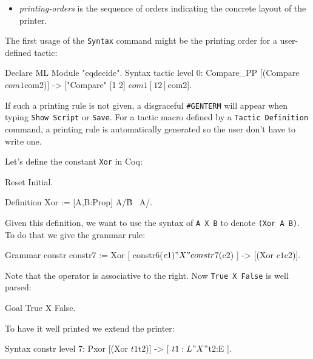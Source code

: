 {\begin{itemize}
\item {\it printing-orders} is the sequence of orders indicating the
  concrete layout of the printer.
\end{itemize}

\firstexample


The first usage of the \texttt{Syntax} command might be the printing
order for a user-defined tactic: 

\begin{coq_example*}
Declare ML Module "eqdecide".
Syntax tactic level 0:
  Compare_PP [(Compare $com1 $com2)]    -> 
            ["Compare" [1 2] $com1 [1 2] $com2].
\end{coq_example*}

If such a printing rule is not given, a disgraceful \verb+#GENTERM+
will appear when typing \texttt{Show Script} or \texttt{Save}. For
a tactic macro defined by a \texttt{Tactic Definition} command, a
printing rule is automatically generated so the user don't have to
write one.


Let's define the constant \verb+Xor+ in Coq:

\begin{coq_eval}
  Reset Initial.
\end{coq_eval}

\begin{coq_example*}
Definition Xor := [A,B:Prop] A/\~B \/ ~A/\B.
\end{coq_example*}

Given this definition, we want to use the syntax of \verb+A X B+
to denote \verb+(Xor A B)+. To do that we give the grammar rule:

\begin{coq_example}
Grammar constr constr7 :=
  Xor [ constr6($c1) "X" constr7($c2) ] -> [(Xor $c1 $c2)].
\end{coq_example}

Note that the operator is associative to the right.  
Now \verb+True X False+ is well parsed:

\begin{coq_example}
Goal True X False.
\end{coq_example}

To have it well printed we extend the printer:

\begin{coq_example}
Syntax constr level 7:
  Pxor  [(Xor  $t1  $t2)] -> [ $t1:L  " X "  $t2:E ].
\end{coq_example}

}
